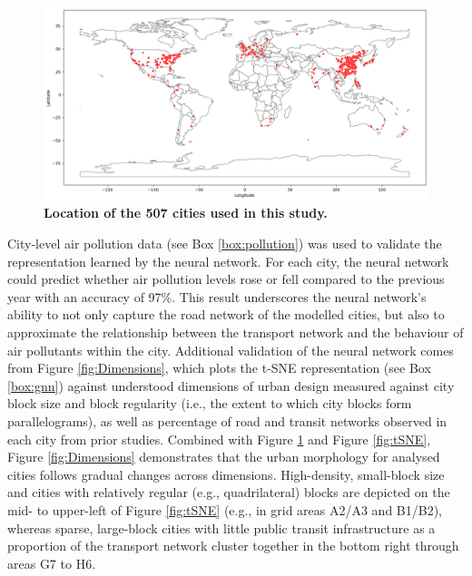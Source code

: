 \documentclass[preprint,10pt]{elsarticle} %
\begin{document}
\begin{figure}
\centering
\includegraphics[trim={0 0 0 0},clip,scale=0.4]{Images/ByCountry_map_Black.png}
\caption{\bf Location of the 507 cities used in this study.}
 \label{fig:clusters}
\end{figure}

City-level air pollution data (see Box \ref{box:pollution}) was used to validate the representation learned by the neural network. For each city, the neural network could predict whether air pollution levels rose or fell compared to the previous year with an accuracy of 97\%. This result underscores the neural network's ability to not only capture the road network of the modelled cities, but also to approximate the relationship between the transport network and the behaviour of air pollutants within the city. Additional validation of the neural network comes from Figure \ref{fig:Dimensions}, which plots the t-SNE representation (see Box \ref{box:gnn}) against understood dimensions of urban design measured against city block size and block regularity (i.e., the extent to which city blocks form parallelograms), as well as percentage of road and transit networks observed in each city from prior studies\cite{Thompson2020,Nice2019b}. Combined with Figure \ref{fig:clusters} and Figure \ref{fig:tSNE}, Figure \ref{fig:Dimensions} demonstrates that the urban morphology for analysed cities follows gradual changes across dimensions. High-density, small-block size and cities with relatively regular (e.g., quadrilateral) blocks are depicted on the mid- to upper-left of Figure \ref{fig:tSNE} (e.g., in grid areas A2/A3 and B1/B2), whereas sparse, large-block cities with little public transit infrastructure as a proportion of the transport network cluster together in the bottom right through areas G7 to H6. 
\end{document}
